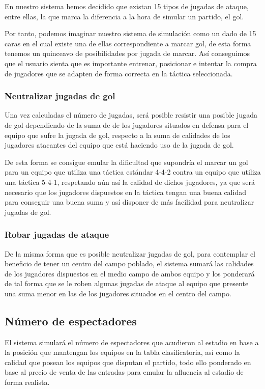 En nuestro sistema hemos decidido que existan 15 tipos de jugadas de ataque, entre ellas, la que marca la
diferencia a la hora de simular un partido, el gol.

Por tanto, podemos imaginar nuestro sistema de simulación como un dado de 15 caras en el
cual existe una de ellas correspondiente a marcar gol, de esta forma tenemos un
quinceavo de posibilidades por jugada de marcar. Así conseguimos que el usuario
sienta que es importante  entrenar, posicionar e intentar la
compra de jugadores que se adapten de forma correcta en la táctica seleccionada.

\subsubsection{Neutralizar jugadas de gol}
Una vez calculadas el número de jugadas, será posible resistir una posible
jugada de gol dependiendo de la suma de  de los
jugadores situados en defensa para el equipo que sufre la jugada de gol, respecto a la suma de calidades  de los
jugadores atacantes del equipo que está haciendo uso de la jugada de gol.

De esta forma se consigue emular la dificultad que supondría el marcar un gol
para un equipo que utiliza una táctica estándar 4-4-2 contra un equipo que utiliza una
táctica 5-4-1, respetando aún así la calidad de dichos jugadores, ya que será
necesario que los jugadores dispuestos en la táctica tengan una buena calidad
para conseguir una buena suma y así disponer de más facilidad para neutralizar
jugadas de gol.

\subsubsection{Robar jugadas de ataque}
De la misma forma que es posible neutralizar jugadas de gol, para contemplar el
beneficio de tener un centro del campo poblado, el sistema sumará las calidades
de los jugadores dispuestos en el medio campo de ambos equipo y los ponderará de
tal forma que se le roben algunas jugadas de ataque al equipo que presente una
suma menor en las  de los jugadores situados en el
centro del campo.

\subsection{Número de espectadores}
El sistema simulará el número de espectadores que acudieron al estadio en base a
la posición que mantengan los equipos en la tabla clasificatoria, así como la
calidad que posean los equipos que disputan el partido, todo ello ponderado
en base al precio de venta de las entradas para emular la afluencia al estadio
de forma realista.

